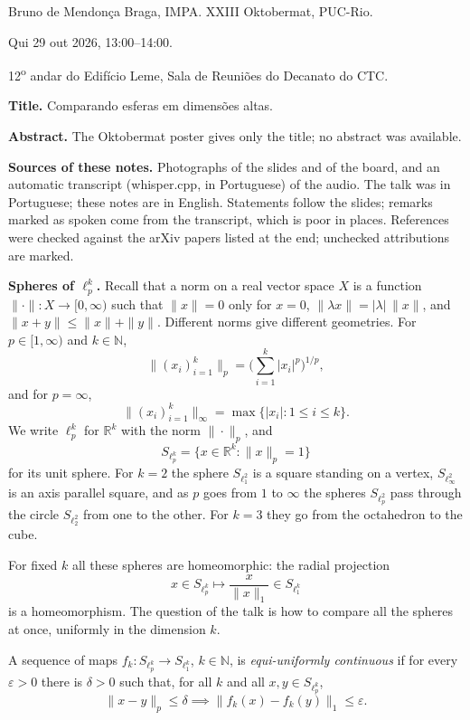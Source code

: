 \noindent
Bruno de Mendon\c{c}a Braga, IMPA.
XXIII Oktobermat, PUC-Rio.

Qui 29 out 2026, 13:00--14:00.

12\textsuperscript{o} andar do Edif\'icio
Leme, Sala de Reuni\~oes do Decanato do CTC.

\medskip\noindent
{\bf Title.} Comparando esferas em
dimens\~oes altas.

\medskip\noindent
{\bf Abstract.} The Oktobermat poster gives
only the title; no abstract was available.

\medskip\noindent
{\bf Sources of these notes.} Photographs of
the slides and of the board, and an
automatic transcript (whisper.cpp, in
Portuguese) of the audio. The talk was in
Portuguese; these notes are in English.
Statements follow the slides; remarks marked
as spoken come from the transcript, which is
poor in places. References were checked
against the arXiv papers listed at the end;
unchecked attributions are marked.

\medskip\noindent
{\bf Spheres of $\ell_p^k$.} Recall that a
norm on a real vector space $X$ is a function
$\|\cdot\| : X \to [0,\infty)$ such that
$\|x\| = 0$ only for $x = 0$,
$\|\lambda x\| = |\lambda|\,\|x\|$, and
$\|x+y\| \le \|x\| + \|y\|$. Different norms
give different geometries. For
$p \in [1,\infty)$ and $k \in \mathbb{N}$,
$$
\|(x_i)_{i=1}^k\|_p
= \Big(\sum_{i=1}^k |x_i|^p\Big)^{1/p},
$$
and for $p = \infty$,
$$
\|(x_i)_{i=1}^k\|_\infty
= \max\{|x_i| : 1 \le i \le k\}.
$$
We write $\ell_p^k$ for $\mathbb{R}^k$ with
the norm $\|\cdot\|_p$, and
$$
S_{\ell_p^k}
= \{x \in \mathbb{R}^k : \|x\|_p = 1\}
$$
for its unit sphere. For $k = 2$ the sphere
$S_{\ell_1^2}$ is a square standing on a
vertex, $S_{\ell_\infty^2}$ is an axis
parallel square, and as $p$ goes from $1$ to
$\infty$ the spheres $S_{\ell_p^2}$ pass
through the circle $S_{\ell_2^2}$ from one to
the other. For $k = 3$ they go from the
octahedron to the cube.

For fixed $k$ all these spheres are
homeomorphic: the radial projection
$$
x \in S_{\ell_p^k}
\mapsto \frac{x}{\|x\|_1}
\in S_{\ell_1^k}
$$
is a homeomorphism. The question of the talk
is how to compare all the spheres at once,
uniformly in the dimension $k$.

\begin{definition}
\label{definition-equi-uniformly-continuous}
A sequence of maps
$f_k : S_{\ell_p^k} \to S_{\ell_1^k}$,
$k \in \mathbb{N}$, is
\emph{equi-uniformly continuous} if for every
$\varepsilon > 0$ there is $\delta > 0$ such
that, for all $k$ and all
$x,y \in S_{\ell_p^k}$,
$$
\|x - y\|_p \le \delta
\implies
\|f_k(x) - f_k(y)\|_1 \le \varepsilon.
$$
\end{definition}

